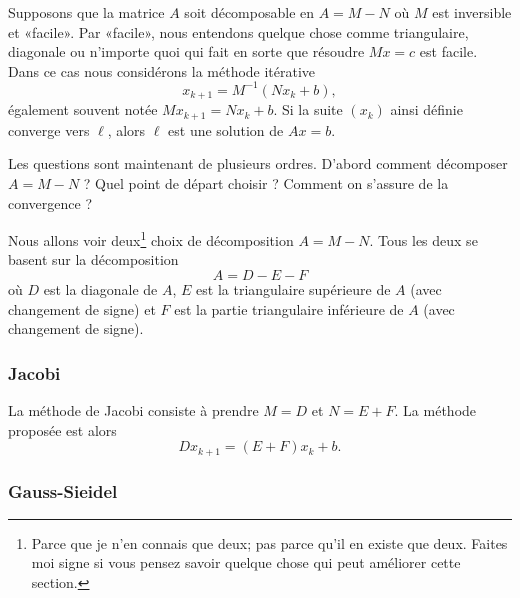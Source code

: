 Supposons que la matrice \( A\) soit décomposable en \( A=M-N\) où \( M\) est inversible et «facile». Par «facile», nous entendons quelque chose comme triangulaire, diagonale ou n'importe quoi qui fait en sorte que résoudre \( Mx=c\) est facile. Dans ce cas nous considérons la méthode itérative
\begin{equation}    \label{EqHEcnkk}
    x_{k+1}=M^{-1}(Nx_k+b),
\end{equation}
également souvent notée \( Mx_{k+1}=Nx_k+b\). Si la suite \( (x_k)\) ainsi définie converge vers \( \ell\), alors \( \ell\) est une solution de \( Ax=b\).

Les questions sont maintenant de plusieurs ordres. D'abord comment décomposer \( A=M-N\) ? Quel point de départ choisir ? Comment on s'assure de la convergence ?

Nous allons voir deux\footnote{Parce que je n'en connais que deux; pas parce qu'il en existe que deux. Faites moi signe si vous pensez savoir quelque chose qui peut améliorer cette section.} choix de décomposition \( A=M-N\). Tous les deux se basent sur la décomposition
\begin{equation}
    A=D-E-F
\end{equation}
où \( D\) est la diagonale de \( A\), \( E\) est la triangulaire supérieure de \( A\) (avec changement de signe) et \( F\) est la partie triangulaire inférieure de \( A\) (avec changement de signe).

\subsubsection{Jacobi}

La méthode de Jacobi consiste à prendre \( M=D\) et \( N=E+F\). La méthode proposée est alors
\begin{equation}
    Dx_{k+1}=(E+F)x_k+b.
\end{equation}

\subsubsection{Gauss-Sieidel}

